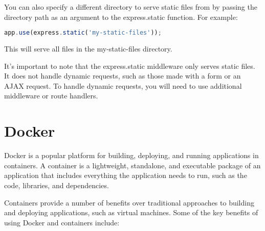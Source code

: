 {You can also specify a different directory to serve static files from by passing the directory path as an argument to the express.static function. For example:

\begin{lstlisting}[language=Javascript, nolol]
app.use(express.static('my-static-files'));
\end{lstlisting}

This will serve all files in the my-static-files directory.

It's important to note that the express.static middleware only serves static files. It does not handle dynamic requests, such as those made with a form or an AJAX request. To handle dynamic requests, you will need to use additional middleware or route handlers.
\section{Docker}

Docker is a popular platform for building, deploying, and running applications in containers. A container is a lightweight, standalone, and executable package of an application that includes everything the application needs to run, such as the code, libraries, and dependencies.

Containers provide a number of benefits over traditional approaches to building and deploying applications, such as virtual machines. Some of the key benefits of using Docker and containers include:

}
